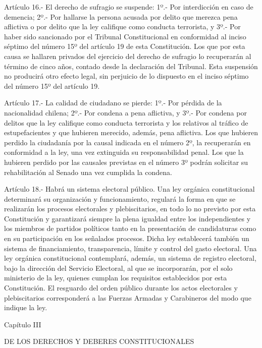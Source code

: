     Artículo 16.- El derecho de sufragio se suspende:
    1º.- Por interdicción en caso de demencia;
    2º.- Por hallarse la persona acusada por delito que merezca pena aflictiva o por delito que la ley califique como conducta terrorista, y
    3º.- Por haber sido sancionado por el Tribunal Constitucional en conformidad al inciso séptimo del número 15º del artículo 19 de esta Constitución. Los que por esta causa se hallaren privados del ejercicio del derecho de sufragio lo recuperarán al término de cinco años, contado desde la declaración del Tribunal. Esta suspensión no producirá otro efecto legal, sin perjuicio de lo dispuesto en el inciso séptimo del número 15º del artículo 19.


    Artículo 17.- La calidad de ciudadano se pierde:     
    1º.- Por pérdida de la nacionalidad chilena;
    2º.- Por condena a pena aflictiva, y
    3º.- Por condena por delitos que la ley califique como conducta terrorista y los relativos al tráfico de estupefacientes y que hubieren merecido, además, pena aflictiva.
    Los que hubieren perdido la ciudadanía por la causal indicada en el número 2º, la recuperarán en conformidad a la ley, una vez extinguida su responsabilidad penal. Los que la hubieren perdido por las causales previstas en el número 3º podrán solicitar su rehabilitación al Senado una vez cumplida la condena.

    Artículo 18.- Habrá un sistema electoral público. Una ley orgánica constitucional determinará su organización y funcionamiento, regulará la forma en que se realizarán los procesos electorales y plebiscitarios, en todo lo no previsto por esta Constitución y garantizará siempre la plena igualdad entre los independientes y los miembros de partidos políticos tanto en la presentación de candidaturas como en su participación en los señalados procesos. Dicha ley establecerá también un sistema de financiamiento, transparencia, límite y control del gasto electoral.
    Una ley orgánica constitucional contemplará, además, un sistema de registro electoral, bajo la dirección del Servicio Electoral, al que se incorporarán, por el solo ministerio de la ley, quienes cumplan los requisitos establecidos por esta Constitución.
    El resguardo del orden público durante los actos electorales y plebiscitarios corresponderá a las Fuerzas Armadas y Carabineros del modo que indique la ley.


    Capítulo III

    DE LOS DERECHOS Y DEBERES CONSTITUCIONALES



